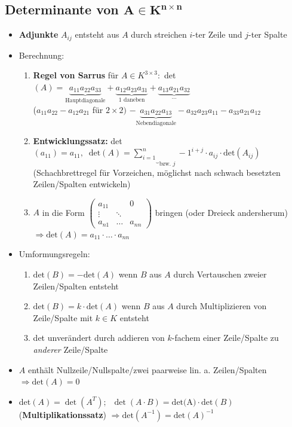 \documentclass[10pt,a4paper]{article}
\begin{document}
\newpage
\subsection{Determinante von $\boldsymbol{A\in K^{n\times n}}$}
\begin{itemize}
\item \textbf{Adjunkte} $A_{ij}$ entsteht aus $A$ durch streichen $i$-ter Zeile und $j$-ter Spalte 
\item Berechnung:
\begin{enumerate}
\item \textbf{Regel von Sarrus} für $A\in K^{3\times 3}:$ det$(A)=\underbrace{a_{11}a_{22}a_{33}}_{\text{Hauptdiagonale}}+\underbrace{a_{12}a_{23}a_{31}}_{\text{1 daneben}}+\underbrace{a_{13}a_{21}a_{32}}_{\dotsc}$\\
($a_{11}a_{22}-a_{12}a_{21}$ für $2\times 2)$
\hspace{2cm} $-\underbrace{a_{31}a_{22}a_{13}}_{\text{Nebendiagonale}}-a_{32}a_{23}a_{11}-a_{33}a_{21}a_{12}$
\item \textbf{Entwicklungssatz:} det$(a_{11})=a_{11}, \;\; \text{det}(A)=\underbrace{\sum_{i=1}^{n}}_{\text{bzw. }j}-1^{i+j}\cdot a_{ij}\cdot \text{det}(A_{ij})\;$ (Schachbrettregel für Vorzeichen, möglichst nach schwach besetzten Zeilen/Spalten entwickeln)
\item $A$ in die Form $\begin{pmatrix} a_{11} &&0\\ \vdots&\ddots&\\a_{n1}&\dotsc&a_{nn}\end{pmatrix}$ bringen (oder Dreieck andersherum) $\Rightarrow \text{det}(A)=a_{11}\cdot \dotsc \cdot a_{nn}$ 
\end{enumerate}
\item Umformungsregeln:
\begin{enumerate}
\item $\text{det}(B)=-\text{det}(A)$ wenn $B$ aus $A$ durch Vertauschen zweier Zeilen/Spalten entsteht
\item $\text{det}(B)=k\cdot \text{det}(A)$ wenn $B$ aus $A$ durch Multiplizieren von Zeile/Spalte mit $k\in K$ entsteht
\item det unverändert durch addieren von $k$-fachem einer Zeile/Spalte zu \textit{anderer} Zeile/Spalte
\end{enumerate}
\item $A$ enthält Nullzeile/Nullspalte/zwei paarweise lin. a. Zeilen/Spalten $\Rightarrow \text{det}(A)=0$
\item det$(A)=\det (A^{T});\;\;\det(A\cdot B)=\text{det(A)}\cdot \text{det}(B)$ (\textbf{Multiplikationssatz}) $\Rightarrow \text{det}(A^{-1})=\text{det}(A)^{-1}$
\end{itemize}
\end{document}
